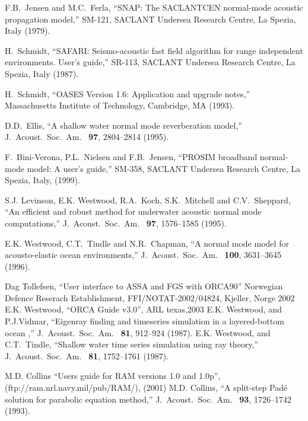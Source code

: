 \documentclass{saclantc}
\begin{document}
\begin{thebibliography}{11}

F.B.~Jensen and M.C.~Ferla,
\newblock ``{S}{N}{A}{P}: The SACLANTCEN normal-mode acoustic
propagation model,''
\newblock SM-121, SACLANT Undersea Research Centre, La Spezia, Italy (1979).

H.~Schmidt,
\newblock ``{S}{A}{F}{A}{R}{I}: Seismo-acoustic fast field algorithm for range
  independent environments. User's guide,''
\newblock SR-113, SACLANT Undersea Research Centre, La Spezia, Italy (1987).

H.~Schmidt,
\newblock ``{O}{A}{S}{E}{S} Version 1.6: Application and upgrade notes,''
\newblock Massachusetts Institute of Technology, Cambridge, MA (1993).

 D.D.\ Ellis, ``A shallow water normal mode reverberation model,''
{ J.\ Acoust.\ Soc.\ Am.\ } {\bf 97}, 2804--2814 (1995).

F.\ Bini-Verona, P.L.\ Nielsen and F.B.~Jensen, ``PROSIM broadband
normal-mode model: A user's guide,'' 
SM-358, SACLANT Undersea Research Centre, La Spezia, Italy, (1999).

S.J. Levinson, E.K. Westwood, R.A.\ Koch, S.K.\ Mitchell and C.V.\
Sheppard, ``An efficient and robust method for underwater acoustic 
 normal mode computations,''
{ J.\ Acoust.\ Soc.\ Am.\ } {\bf 97}, 1576--1585 (1995).

E.K. Westwood, C.T.\ Tindle and N.R.\ Chapman, ``A normal mode model for acousto-elastic ocean environments,''
{ J.\ Acoust.\ Soc.\ Am.\ } {\bf 100}, 3631--3645 (1996).

Dag Tollefsen, ``User interface to ASSA and FGS with ORCA90''
Norwegian Defence Reserach Establishment,  FFI/NOTAT-2002/04824, Kjeller, Norge 2002
\bibitem{Westwood03}
E.K. Westwood, ``ORCA Guide v3.0'', ARL texas,2003
E.K. Westwood, and P.J.Vidmar, ``Eigenray finding and timeseries
simulation in a layered-bottom ocean ,''
{ J.\ Acoust.\ Soc.\ Am.\ } {\bf 81}, 912--924 (1987).
E.K. Westwood, and C.T.\ Tindle, ``Shallow water time series
simulation using ray theory,''
{ J.\ Acoust.\ Soc.\ Am.\ } {\bf 81}, 1752--1761 (1987).

 M.D. Collins ``Users guide for RAM versions 1.0
and 1.0p'', (ftp://ram.nrl.navy.mil/pub/RAM/), (2001)
M.D. Collins, ``A split-step Pad\'{e} solution for parabolic equation method,''
{ J.\ Acoust.\ Soc.\ Am.\ } {\bf 93}, 1726--1742 (1993).


\end{thebibliography}
\end{document}
